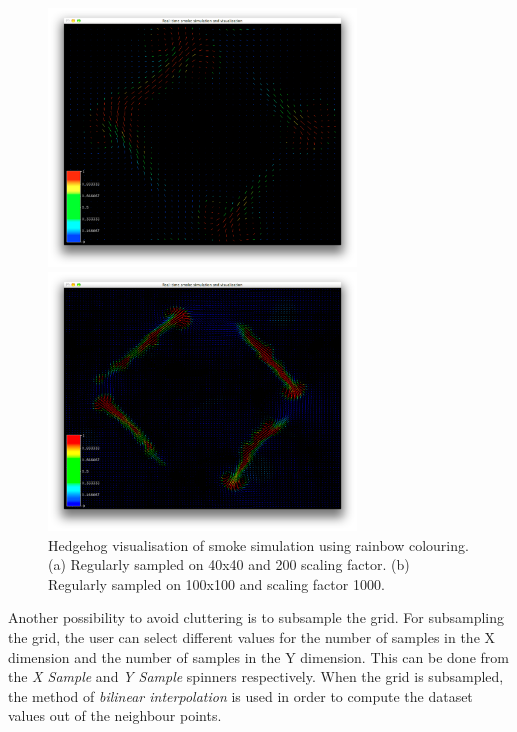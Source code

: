 \begin{figure}[htbp]
\begin{center}
\begin{minipage}[t]{0.48\textwidth}
\includegraphics[height=2.7in]{figures/glyph/hedgehogsLSSSF.png}
\end{minipage}
\begin{minipage}[t]{0.48\textwidth}
\includegraphics[height=2.7in]{figures/glyph/hedgehogsMSDSF.png}
\end{minipage}
\caption{Hedgehog visualisation of smoke simulation using rainbow colouring. (a) Regularly sampled on 40x40 and 200 scaling factor. (b) Regularly sampled on 100x100 and scaling factor 1000.}
\label{fig:hedgehogsSamplesScaling}
\end{center}
\end{figure}

Another possibility to avoid cluttering is to subsample the grid. For subsampling the grid, the user can select different values for the number of samples in the X dimension and the number of samples in the Y dimension. This can be done from the \emph{X Sample} and \emph{Y Sample} spinners respectively. When the grid is subsampled, the method of \emph{bilinear interpolation} is used in order to compute the dataset values out of the neighbour points.

